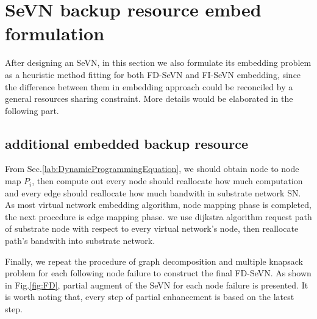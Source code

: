 \section{SeVN backup resource embed formulation}
After designing an SeVN, in this section we also formulate its embedding problem as a heuristic method fitting for both FD-SeVN and FI-SeVN embedding, since the difference between them in embedding approach could be reconciled by a general resources sharing constraint. More details would be elaborated in the following part.



\subsection{additional embedded backup resource}
From Sec.\ref{lab:DynamicProgrammingEquation}, we should obtain node to node map $P_i$, then compute out every node should reallocate how much computation and every edge should reallocate how much bandwith in substrate network SN. As most virtual network embedding algorithm, node mapping phase is completed, the next procedure is edge mapping phase. we use dijkstra algorithm request path of substrate node with respect to every virtual network's node, then reallocate path's bandwith into substrate network.


Finally, we repeat the procedure of graph decomposition and multiple knapsack problem for each following node failure to
construct the final FD-SeVN. As shown in Fig.\ref{fig:FD}, partial augment of the SeVN for each node failure is presented. It is
worth noting that, every step of partial enhancement is based on the latest step.


